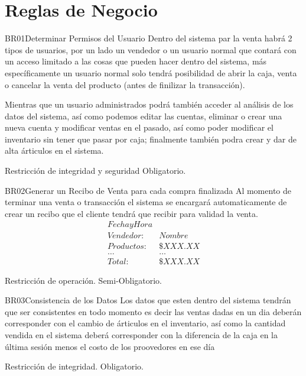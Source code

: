 \section{Reglas de Negocio}

	\begin{BussinesRule}{BR01}{Determinar Permisos del Usuario} 
		\BRitem[Descripción:] Dentro del sistema par la venta habrá 2 tipos de usuarios, por un lado un vendedor
		o un usuario normal que contará con un acceso limitado a las cosas que pueden hacer dentro del sistema,
		más específicamente un usuario normal solo tendrá posibilidad de abrir la caja, venta o cancelar la venta
		del producto (antes de finilizar la transacción).

		Mientras que un usuario administrados podrá también acceder al análisis de los datos del sistema, así como
		podemos editar las cuentas, eliminar o crear una nueva cuenta y modificar ventas en el pasado, así como poder
		modificar el inventario sin tener que pasar por caja; finalmente también podra crear y dar de alta árticulos en
		el sistema.

		\BRitem[Tipo:] Restricción de integridad y seguridad
		\BRitem[Nivel:] Obligatorio.
	\end{BussinesRule}

	\begin{BussinesRule}{BR02}{Generar un Recibo de Venta para cada compra finalizada}
		\BRitem[Descripción:] Al momento de terminar una venta o transacción el sistema se encargará automaticamente de
		crear un recibo que el cliente tendrá que recibir para validad la venta.
		\begin{displaymath}\begin{array}{lr}
				Fecha y Hora & \\
				Vendedor: & Nombre\\
				Productos: & \$ XXX.XX\\
				\dots &\dots\\
				Total: & \$ XXX.XX
			\end{array}\end{displaymath}

		\BRitem[Tipo:] Restricción de operación.
		\BRitem[Nivel:] Semi-Obligatorio.
	\end{BussinesRule}

	\begin{BussinesRule}{BR03}{Consistencia de los Datos}
		\BRitem[Descripción:] Los datos que esten dentro del sistema tendrán que ser consistentes en todo momento
		es decir las ventas dadas en un dia deberán corresponder con el cambio de árticulos en el inventario, así como
		la cantidad vendida en el sistema deberá corresponder con la diferencia de la caja en la última sesión menos
		el costo de los proovedores en ese día

		\BRitem[Tipo:] Restricción de integridad.
		\BRitem[Nivel:] Obligatorio.
	\end{BussinesRule}

